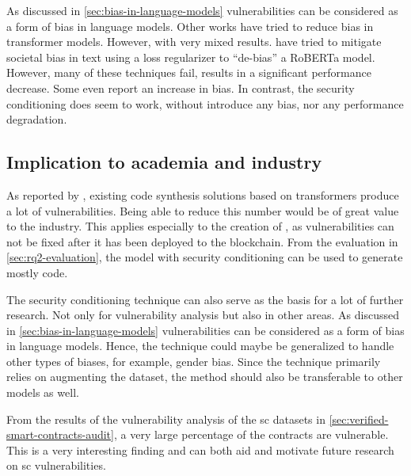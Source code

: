 As discussed in \cref{sec:bias-in-language-models} vulnerabilities can be considered as a form of bias in language models. Other works have tried to reduce bias in transformer models. However, with very mixed results. \cite{Silva2021TowardsAC} have tried to mitigate societal bias in text using a loss regularizer to “de-bias” a RoBERTa model. However, many of these techniques fail, results in a significant performance decrease. Some even report an increase in bias. In contrast, the security conditioning does seem to work, without introduce any bias, nor any performance degradation.

\subsection{Implication to academia and industry}
\label{sec:rq2-implication-to-academia-industry}
As reported by \textcite{pearch2021asleep}, existing code synthesis solutions based on transformers produce a lot of vulnerabilities. Being able to reduce this number would be of great value to the industry. This applies especially to the creation of , as vulnerabilities can not be fixed after it has been deployed to the blockchain. From the evaluation in \cref{sec:rq2-evaluation}, the model with security conditioning can be used to generate  mostly  code.

The security conditioning technique can also serve as the basis for a lot of further research. Not only for vulnerability analysis but also in other areas. As discussed in \cref{sec:bias-in-language-models} vulnerabilities can be considered as a form of bias in language models. Hence, the technique could maybe be generalized to handle other types of biases, for example, gender bias. Since the technique primarily relies on augmenting the dataset, the method should also be transferable to other models as well.

From the results of the vulnerability analysis of the \acrshort{sc} datasets in \cref{sec:verified-smart-contracts-audit}, a very large percentage of the  contracts are vulnerable. This is a very interesting finding and can both aid and motivate future research on \acrshort{sc} vulnerabilities.

